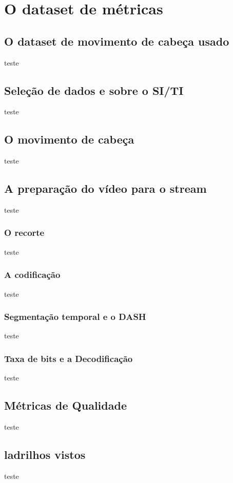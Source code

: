 
\chapter{O dataset de métricas}\label{Cap:Dataset}

\section{O dataset de movimento de cabeça usado}
teste

\section{Seleção de dados e sobre o SI/TI}
teste

\section{O movimento de cabeça}
teste

\section{A preparação do vídeo para o stream}
teste

\subsection{O recorte}
teste

\subsection{A codificação}
teste

\subsection{Segmentação temporal e o DASH}
teste

\subsection{Taxa de bits e a Decodificação}
teste

\section{Métricas de Qualidade}
teste

\section{ladrilhos vistos}
teste

